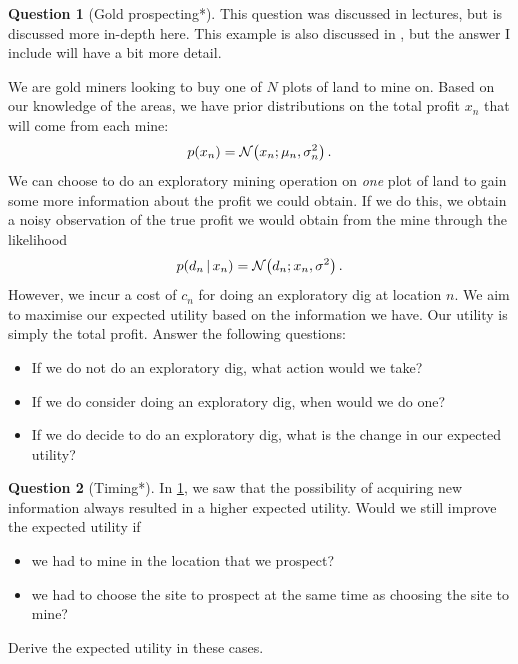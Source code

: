 \documentclass[a4paper]{article}
\theoremstyle{definition}
\newtheorem{question}{Question}
\begin{document}
\begin{question}[Gold prospecting*]
\label{q:gold-prospecting}
This question was discussed in lectures, but is discussed more in-depth here. This example is also discussed in \citet[ch.~36]{itila}, but the answer I include will have a bit more detail.

We are gold miners looking to buy one of $N$ plots of land to mine on. Based on our knowledge of the areas, we have prior distributions on the total profit $x_n$ that will come from each mine:
\begin{align}
p(x_n) = \NormDist{x_n; \mu_n, \sigma^2_n} \,.
\end{align}
We can choose to do an exploratory mining operation on \emph{one} plot of land to gain some more information about the profit we could obtain. If we do this, we obtain a noisy observation of the true profit we would obtain from the mine through the likelihood
\begin{align}
p(d_n\given x_n) = \NormDist{d_n; x_n, \sigma^2} \,.
\end{align}
However, we incur a cost of $c_n$ for doing an exploratory dig at location $n$. We aim to maximise our expected utility based on the information we have. Our utility is simply the total profit. Answer the following questions:
\begin{itemize}
\item If we do not do an exploratory dig, what action would we take?
\item If we do consider doing an exploratory dig, when would we do one?
\item If we do decide to do an exploratory dig, what is the change in our expected utility?
\end{itemize}
\end{question}


\begin{question}[Timing*]
\label{q:timing}
In \cref{q:gold-prospecting}, we saw that the possibility of acquiring new information always resulted in a higher expected utility. Would we still improve the expected utility if
\begin{itemize}
\item we had to mine in the location that we prospect?
\item we had to choose the site to prospect at the same time as choosing the site to mine?
\end{itemize}
Derive the expected utility in these cases.
\end{question}
\end{document}
